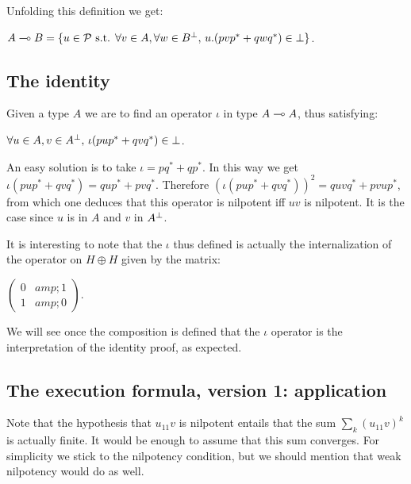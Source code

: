 Unfolding this definition we get:

\begin{description}
\tightlist
\item[]
\(A\multimap B = \{u\in\mathcal{P}\text{ s.t. } \forall v\in A, \forall w\in B^\bot,\, u.(pvp^* + qwq^*) \in\bot\}\).
\end{description}

\subsection{The identity}\label{the-identity}

Given a type \(A\) we are to find an operator \(\iota\) in type
\(A\multimap A\), thus satisfying:

\begin{description}
\tightlist
\item[]
\(\forall u\in A, v\in A^\bot,\, \iota(pup^* + qvq^*)\in\bot\).
\end{description}

An easy solution is to take \(\iota = pq^* + qp^*\). In this way we get
\(\iota(pup^* + qvq^*) = qup^* + pvq^*\). Therefore
\((\iota(pup^* + qvq^*))^2 = quvq^* + pvup^*\), from which one deduces
that this operator is nilpotent iff \(uv\) is nilpotent. It is the case
since \(u\) is in \(A\) and \(v\) in \(A^\bot\).

It is interesting to note that the \(\iota\) thus defined is actually
the internalization of the operator on \(H\oplus H\) given by the
matrix:

\begin{description}
\tightlist
\item[]
\(\begin{pmatrix}0 &amp; 1\\1 &amp; 0\end{pmatrix}\).
\end{description}

We will see once the composition is defined that the \(\iota\) operator
is the interpretation of the identity proof, as expected.

\subsection{The execution formula, version 1: application}\label{the-execution-formula-version-1-application}

Note that the hypothesis that \(u_{11}v\) is nilpotent entails that the
sum \(\sum_k(u_{11}v)^k\) is actually finite. It would be enough to
assume that this sum converges. For simplicity we stick to the
nilpotency condition, but we should mention that weak nilpotency would
do as well.

